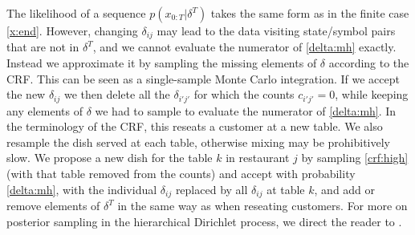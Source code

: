 The likelihood of a sequence $p(x_{0:T}|\delta^T)$ takes the same form as in the finite case \eqref{x:end}.  However, changing $\delta_{ij}$ may lead to the data visiting state/symbol pairs that are not in $\delta^T$, and we cannot evaluate the numerator of \eqref{delta:mh} exactly.  Instead we approximate it by sampling the missing elements of $\delta$ according to the CRF.  This can be seen as a single-sample Monte Carlo integration.  If we accept the new $\delta_{ij}$ we then delete all the $\delta_{i'j'}$ for which the counts $c_{i'j'} = 0$, while keeping any elements of $\delta$ we had to sample to evaluate the numerator of \eqref{delta:mh}.  In the terminology of the CRF, this reseats a customer at a new table.  We also resample the dish served at each table, otherwise mixing may be prohibitively slow.  We propose a new dish for the table $k$ in restaurant $j$ by sampling \eqref{crf:high} (with that table removed from the counts) and accept with probability \eqref{delta:mh}, with the individual $\delta_{ij}$ replaced by all $\delta_{ij}$ at table $k$, and add or remove elements of $\delta^T$ in the same way as when reseating customers.  For more on posterior sampling in the hierarchical Dirichlet process, we direct the reader to \cite{Teh2006}.
  

 
 
 
 
